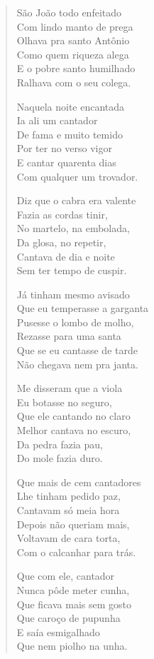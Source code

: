 \begin{verse}
São João todo enfeitado\\
Com lindo manto de prega\\
Olhava pra santo Antônio\\
Como quem riqueza alega\\
E o pobre santo humilhado\\
Ralhava com o seu colega.


Naquela noite encantada\\
Ia ali um cantador\\
De fama e muito temido\\
Por ter no verso vigor\\
E cantar quarenta dias\\
Com qualquer um trovador.

Diz que o cabra era valente\\
Fazia as cordas tinir,\\
No martelo, na embolada,\\
Da glosa, no repetir,\\
Cantava de dia e noite\\
Sem ter tempo de cuspir.

Já tinham mesmo avisado\\
Que eu temperasse a garganta\\
Pusesse o lombo de molho,\\
Rezasse para uma santa\\
Que se eu cantasse de tarde\\
Não chegava nem pra janta.

Me disseram que a viola\\
Eu botasse no seguro,\\
Que ele cantando no claro\\
Melhor cantava no escuro,\\
Da pedra fazia pau,\\
Do mole fazia duro.


Que mais de cem cantadores\\
Lhe tinham pedido paz,\\
Cantavam só meia hora\\
Depois não queriam mais,\\
Voltavam de cara torta,\\
Com o calcanhar para trás.

Que com ele, cantador\\
Nunca pôde meter cunha,\\
Que ficava mais sem gosto\\
Que caroço de pupunha\\
E saía esmigalhado\\
Que nem piolho na unha.


\end{verse}

